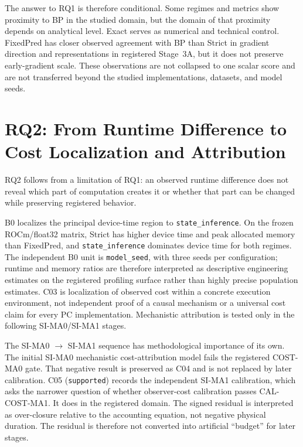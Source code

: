 The answer to RQ1 is therefore conditional. Some regimes and metrics show proximity to
BP in the studied domain, but the domain of that proximity depends on analytical
level. Exact serves as numerical and technical control. FixedPred has closer observed
agreement with BP than Strict in gradient direction and representations in registered
Stage~3A, but it does not preserve early-gradient scale. These observations are not
collapsed to one scalar score and are not transferred beyond the studied
implementations, datasets, and model seeds.

\section{RQ2: From Runtime Difference to Cost Localization and Attribution}
\label{sec:discussion-rq2-en}

RQ2 follows from a limitation of RQ1: an observed runtime difference does not reveal
which part of computation creates it or whether that part can be changed while
preserving registered behavior.

B0 localizes the principal device-time region to \texttt{state\_inference}. On the
frozen ROCm/float32 matrix, Strict has higher device time and peak allocated memory than
FixedPred, and \texttt{state\_inference} dominates device time for both regimes. The
independent B0 unit is \texttt{model\_seed}, with three seeds per configuration;
runtime and memory ratios are therefore interpreted as descriptive engineering
estimates on the registered profiling surface rather than highly precise population
estimates. C03 is localization of observed cost within a concrete execution environment,
not independent proof of a causal mechanism or a universal cost claim for every PC
implementation. Mechanistic attribution is tested only in the following SI-MA0/SI-MA1
stages.

The SI-MA0 $\rightarrow$ SI-MA1 sequence has methodological importance of its own. The
initial SI-MA0 mechanistic cost-attribution model fails the registered COST-MA0 gate.
That negative result is preserved as C04 and is not replaced by later calibration. C05
(\texttt{supported}) records the independent SI-MA1 calibration, which asks the
narrower question of whether observer-cost calibration passes CAL-COST-MA1. It does in
the registered domain. The signed residual is interpreted as over-closure relative to
the accounting equation, not negative physical duration. The residual is therefore not
converted into artificial ``budget'' for later stages.

